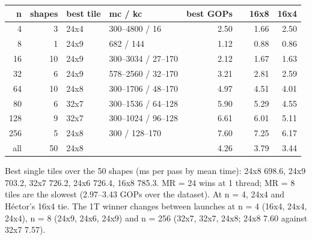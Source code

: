 \begin{center}\small
\begin{tabular}{@{}rrll rr rr@{}}
\toprule
n & shapes & best tile & mc / kc & best GOPs & & 16x8 & 16x4 \\
\midrule
4 & 3 & 24x4 & 300--4800 / 16 & 2.50 &  & 1.66 & 2.50 \\
8 & 1 & 24x9 & 682 / 144 & 1.12 &  & 0.88 & 0.86 \\
16 & 10 & 24x9 & 300--3034 / 27--170 & 2.12 &  & 1.67 & 1.63 \\
32 & 6 & 24x9 & 578--2560 / 32--170 & 3.21 &  & 2.81 & 2.59 \\
64 & 10 & 24x8 & 300--1706 / 48--170 & 4.97 &  & 4.51 & 4.01 \\
80 & 6 & 32x7 & 300--1536 / 64--128 & 5.90 &  & 5.29 & 4.55 \\
128 & 9 & 32x7 & 300--1024 / 96--128 & 6.61 &  & 6.01 & 5.11 \\
256 & 5 & 24x8 & 300 / 128--170 & 7.60 &  & 7.25 & 6.17 \\
\midrule
all & 50 & 24x8 &  & 4.26 &  & 3.79 & 3.44 \\
\bottomrule
\end{tabular}
\end{center}

\noindent Best single tiles over the 50 shapes (ms per pass by mean time): 24x8 698.6, 24x9 703.2, 32x7 726.2, 24x6 726.4, 16x8 785.3. MR = 24 wins at 1 thread; MR = 8 tiles are the slowest (2.97--3.43 GOPs over the dataset). At n = 4, 24x4 and H\'ector's 16x4 tie. The 1T winner changes between launches at n = 4 (16x4, 24x4, 24x4), n = 8 (24x9, 24x6, 24x9) and n = 256 (32x7, 32x7, 24x8; 24x8 7.60 against 32x7 7.57).

